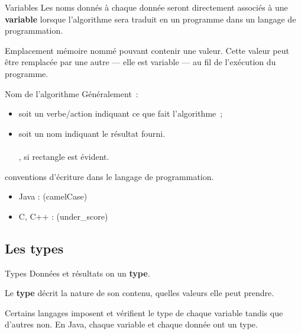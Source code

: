 \begin{hideedit}
\begin{frame}{Variables}
  Les noms donnés à chaque donnée seront directement associés à une 
  \textbf{variable} lorsque l'algorithme sera traduit en un programme dans 
  un langage de programmation.

  \pause
  \begin{definition}[Variable]
    Emplacement
    mémoire nommé pouvant contenir une valeur. Cette valeur peut être
    remplacée par une autre --- elle est variable --- au fil de l'exécution du
    programme.
  \end{definition}
\end{frame}

\begin{frame}{Nom de l'algorithme}
  Généralement~:
  \begin{itemize}
    \item soit un verbe/action indiquant ce que fait l’algorithme~;\\
      \pause \qquad {}
    \pause
    \item soit un nom indiquant le résultat fourni.\\
      \pause \qquad {}\\
      \pause \qquad {}, si \og rectangle \fg est évident.
  \end{itemize}

  \pause \bcattention conventions d'écriture dans le langage de programmation.
  \begin{itemize}
    \item Java :  (camelCase)
    \item C, C++ :  (under\_score)
  \end{itemize}
\end{frame}

\subsection{Les types}
\begin{frame}{Types}
  Données et résultats on un \textbf{type}.

  Le \textbf{type} décrit la nature de son contenu, quelles valeurs elle
  peut prendre.

  Certains langages imposent et vérifient le type de chaque variable tandis
  que d'autres non. En Java, chaque variable et chaque donnée ont un type.


\end{frame}
\end{hideedit}
